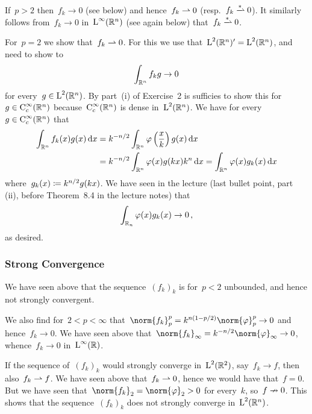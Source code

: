If~$p > 2$ then~$f_k \to 0$ (see below) and hence~$f_k \rightharpoonup 0$ (resp.~$f_k \wtostar 0$).
It similarly follows from~$f_k \to 0$ in~$\operatorname{L}^\infty(\mathbb{R}^n)$ (see again below) that~$f_k \wtostar 0$.

For~$p = 2$ we show that~$f_k \rightharpoonup 0$.
For this we use that~$\operatorname{L}^2(\mathbb{R}^n)' = \operatorname{L}^2(\mathbb{R}^n)$, and need to show to
\[
      \int_{\mathbb{R}^n} f_k g
  \to 0
\]
for every~$g \in \operatorname{L}^2(\mathbb{R}^n)$.
By part~(i) of Exercise~2 is sufficies to show this for~$g \in \operatorname{C}^\infty_c(\mathbb{R}^n)$ because~$\operatorname{C}^\infty_c(\mathbb{R}^n)$ is dense in~$\operatorname{L}^2(\mathbb{R}^n)$.
We have for every~$g \in \operatorname{C}^\infty_c(\mathbb{R}^n)$ that
\begin{align*}
        \int_{\mathbb{R}^n} f_k(x) g(x) \,\text{d}x
  &=    k^{-n/2} \int_{\mathbb{R}^n} \varphi\left( \frac{x}{k} \right) g(x) \,\text{d}x \\
  &=    k^{-n/2} \int_{\mathbb{R}^n} \varphi(x) g(kx) k^n \,\text{d}x
   =    \int_{\mathbb{R}^n} \varphi(x) g_k(x) \,\text{d}x
\end{align*}
where~$g_k(x) \coloneqq k^{n/2} g(kx)$.
We have seen in the lecture (last bullet point, part (ii), before Theorem~8.4 in the lecture notes) that
\[
      \int_{\mathbb{R}_n} \varphi(x) g_k(x)
  \to 0 \,,
\]
as desired.





\subsubsection{Strong Convergence}

We have seen above that the sequence~$(f_k)_k$ is for~$p < 2$ unbounded, and hence not strongly convergent.

We also find for~$2 < p < \infty$ that~$\norm{f_k}_p^p = k^{n(1-p/2)} \norm{\varphi}_p^p \to 0$ and hence~$f_k \to 0$.
We have seen above that~$\norm{f_k}_\infty = k^{-n/2} \norm{\varphi}_\infty \to 0$, whence~$f_k \to 0$ in~$\operatorname{L}^\infty(\mathbb{R})$.

If the sequence of~$(f_k)_k$ would strongly converge in~$\operatorname{L}^2(\mathbb{R}^2)$, say~$f_k \to f$, then also~$f_k \rightharpoonup f$.
We have seen above that~$f_k \rightharpoonup 0$, hence we would have that~$f = 0$.
But we have seen that~$\norm{f_k}_2 = \norm{\varphi}_2 > 0$ for every~$k$, so~$f \nrightarrow 0$.
This shows that the sequence~$(f_k)_k$ does not strongly converge in~$\operatorname{L}^2(\mathbb{R}^n)$.
















